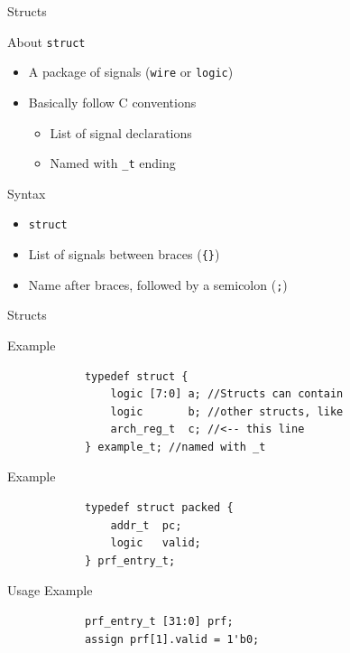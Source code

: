 \documentclass[dvipsnames]{beamer}
\begin{document}
\begin{frame}{Structs}
	\begin{block}{About \texttt{struct}}
		\begin{itemize}
			\item A package of signals (\texttt{wire} or \texttt{logic})
			\item Basically follow C conventions
				\begin{itemize}
					\item List of signal declarations
					\item Named with \texttt{\_t} ending
				\end{itemize}
		\end{itemize}
	\end{block}
	\begin{block}{Syntax}
		\begin{itemize}
			\item \texttt{struct}
			\item List of signals between braces (\texttt{\{\}})
			\item Name after braces, followed by a semicolon (\texttt{;})
		\end{itemize}
	\end{block}
\end{frame}

\begin{frame}[fragile]{Structs}
	\begin{block}{Example}
		\vspace*{-12pt}
		\begin{verbatim}
			typedef struct {
			    logic [7:0] a; //Structs can contain
			    logic       b; //other structs, like
			    arch_reg_t  c; //<-- this line
			} example_t; //named with _t
		\end{verbatim}
	\end{block}
	\begin{block}{Example}
		\vspace*{-12pt}
		\begin{verbatim}
			typedef struct packed {
			    addr_t  pc;
			    logic   valid;
			} prf_entry_t;
		\end{verbatim}
	\end{block}
	\begin{block}{Usage Example}
		\vspace*{-12pt}
		\begin{verbatim}
			prf_entry_t [31:0] prf;
			assign prf[1].valid = 1'b0;
		\end{verbatim}
	\end{block}
\end{frame}
\end{document}
